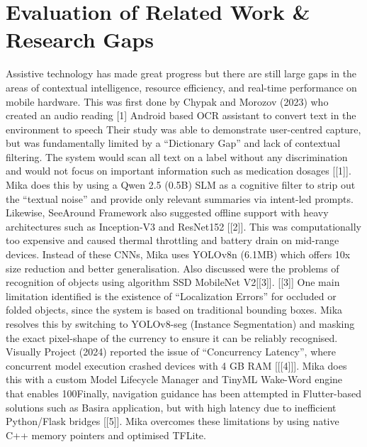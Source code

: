 \documentclass[12pt,a4paper]{report}
\begin{document}
\section{Evaluation of Related Work \& Research Gaps}
Assistive technology has made great progress but there are still large gaps in the areas of contextual intelligence, resource efficiency, and real-time performance on mobile hardware. This was first done by Chypak and Morozov (2023) who created an audio reading [1] Android based OCR assistant to convert text in the environment to speech Their study was able to demonstrate user-centred capture, but was fundamentally limited by a “Dictionary Gap” and lack of contextual filtering. The system would scan all text on a label without any discrimination and would not focus on important information such as medication dosages [[1]]. Mika does this by using a Qwen 2.5 (0.5B) SLM as a cognitive filter to strip out the “textual noise” and provide only relevant summaries via intent-led prompts.
Likewise, SeeAround Framework also suggested offline support with heavy architectures such as Inception-V3 and ResNet152 [[2]]. This was computationally too expensive and caused thermal throttling and battery drain on mid-range devices. Instead of these CNNs, Mika uses YOLOv8n (6.1MB) which offers 10x size reduction and better generalisation.
\noindent Also discussed were the problems of recognition of objects using algorithm SSD MobileNet V2[[3]]. [[3]] One main limitation identified is the existence of “Localization Errors” for occluded or folded objects, since the system is based on traditional bounding boxes.
Mika resolves this by switching to YOLOv8-seg (Instance Segmentation) and masking the exact pixel-shape of the currency to ensure it can be reliably recognised. Visually Project (2024) reported the issue of “Concurrency Latency”, where concurrent model execution crashed devices with 4 GB RAM [[[4]]]. Mika does this with a custom Model Lifecycle Manager and TinyML Wake-Word engine that enables 100Finally, navigation guidance has been attempted in Flutter-based solutions such as Basira application, but with high latency due to inefficient Python/Flask bridges [[5]]. Mika overcomes these limitations by using native C++ memory pointers and optimised TFLite.
\end{document}
